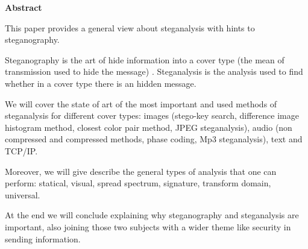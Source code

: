 \documentclass[../../main.tex]{subfiles}
\begin{document}
\begin{center}
    \center \textbf{Abstract}
\end{center}

\vspace{0.1cm}

This paper provides a general view about steganalysis with hints to
steganography. 

Steganography is the art of hide information into a cover type (the mean of
transmission used to hide the message) \cite{steganography-definition}.
Steganalysis is the analysis used to find whether in a cover type there is an
hidden message.

We will cover the state of art of the most important and used methods of
steganalysis for different cover types: images (stego-key search, difference
image histogram method, closest color pair method, JPEG steganalysis), audio
(non compressed and compressed methods, phase coding, Mp3 steganalysis), text
and TCP/IP.

Moreover, we will give describe the general types of analysis that one can
perform: statical, visual, spread spectrum, signature, transform domain,
universal.

At the end we will conclude explaining why steganography and steganalysis are
important, also joining those two subjects with a wider theme like security in
sending information.
\end{document}
